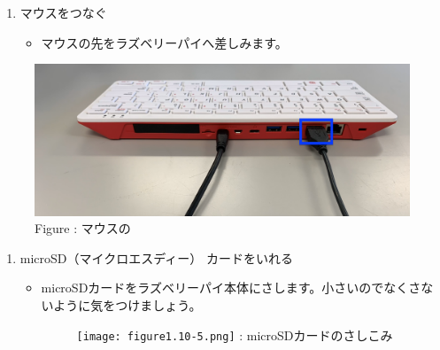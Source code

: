 \documentclass[a4paper,12pt]{jarticle}
\begin{document}
\begin{enumerate}
\begin{enumerate}
\begin{itemize}
        \end{itemize}
  \item マウスをつなぐ

        \begin{itemize}
          \item
                マウスの先をラズベリーパイへ差しみます。
        \end{itemize}
\end{enumerate}

\begin{figure}[h]
  \centering
  \begin{minipage}{0.5\textwidth}
    {\upshape
      \includegraphics[width=\linewidth]{figure1.10-4.png}
      \newline
      Figure :
      マウスの}
  \end{minipage}
\end{figure}
\setcounter{saveenum}{\value{enumi}}
\begin{enumerate}
  \setcounter{enumi}{\value{saveenum}}
  \clearpage
  \item
        microSD（マイクロエスディー）
        カードをいれる

        \begin{itemize}
          \item
                microSDカードをラズベリーパイ本体にさします。小さいのでなくさないように気をつけましょう。

                \begin{figure}[h]
                  \centering
                  \begin{minipage}{0.45\textwidth}
                    {\upshape
                      \texttt{[image: figure1.10-5.png]}
                      \newline
                      : microSDカードのさしこみ}
                  \end{minipage}
                \end{figure}


\end{itemize}
\end{enumerate}
\end{enumerate}
\end{document}
